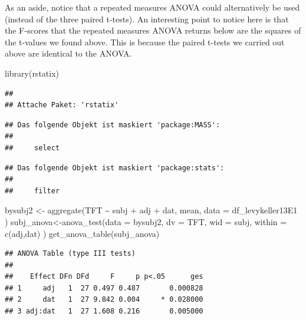 \documentclass[
  12pt,
]{krantz}
\newenvironment{Shaded}{\begin{snugshade}}{\end{snugshade}}
\newcommand{\AttributeTok}[1]{\textcolor[rgb]{0.77,0.63,0.00}{#1}}
\newcommand{\FunctionTok}[1]{\textcolor[rgb]{0.00,0.00,0.00}{#1}}
\newcommand{\NormalTok}[1]{#1}
\newcommand{\OtherTok}[1]{\textcolor[rgb]{0.56,0.35,0.01}{#1}}
\newcommand{\SpecialCharTok}[1]{\textcolor[rgb]{0.00,0.00,0.00}{#1}}
\theoremstyle{definition}
\theoremstyle{definition}
\theoremstyle{definition}
\theoremstyle{definition}
\theoremstyle{remark}
\begin{document}
As an aside, notice that a repeated measures ANOVA could alternatively be used (instead of the three paired t-tests). An interesting point to notice here is that the F-scores that the repeated measures ANOVA returns below are the squares of the t-values we found above. This is because the paired t-tests we carried out above are identical to the ANOVA.

\begin{Shaded}
\begin{Highlighting}[]
\FunctionTok{library}\NormalTok{(rstatix)}
\end{Highlighting}
\end{Shaded}

\begin{verbatim}
## 
## Attache Paket: 'rstatix'
\end{verbatim}

\begin{verbatim}
## Das folgende Objekt ist maskiert 'package:MASS':
## 
##     select
\end{verbatim}

\begin{verbatim}
## Das folgende Objekt ist maskiert 'package:stats':
## 
##     filter
\end{verbatim}

\begin{Shaded}
\begin{Highlighting}[]
\NormalTok{bysubj2 }\OtherTok{\textless{}{-}} \FunctionTok{aggregate}\NormalTok{(TFT }\SpecialCharTok{\textasciitilde{}}\NormalTok{ subj }\SpecialCharTok{+}\NormalTok{ adj }\SpecialCharTok{+}\NormalTok{ dat,}
\NormalTok{  mean,}
  \AttributeTok{data =}\NormalTok{ df\_levykeller13E1}
\NormalTok{)}
\NormalTok{subj\_anova}\OtherTok{\textless{}{-}}\FunctionTok{anova\_test}\NormalTok{(}\AttributeTok{data =}\NormalTok{ bysubj2, }
           \AttributeTok{dv =}\NormalTok{ TFT, }
           \AttributeTok{wid =}\NormalTok{ subj,}
           \AttributeTok{within =} \FunctionTok{c}\NormalTok{(adj,dat)}
\NormalTok{  )}
\FunctionTok{get\_anova\_table}\NormalTok{(subj\_anova)}
\end{Highlighting}
\end{Shaded}

\begin{verbatim}
## ANOVA Table (type III tests)
## 
##    Effect DFn DFd     F     p p<.05      ges
## 1     adj   1  27 0.497 0.487       0.000828
## 2     dat   1  27 9.842 0.004     * 0.028000
## 3 adj:dat   1  27 1.608 0.216       0.005000
\end{verbatim}
\end{document}
